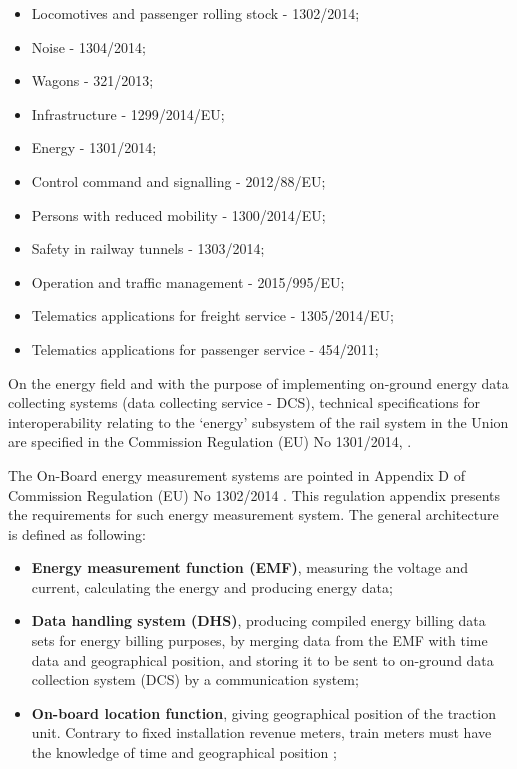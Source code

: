 \begin{itemize}
	\setlength\itemsep{-0.5em}
	\item Locomotives and passenger rolling stock - 1302/2014;
	\item Noise - 1304/2014;
	\item Wagons - 321/2013;
	\item Infrastructure - 1299/2014/EU;
	\item Energy - 1301/2014;
	\item Control command and signalling - 2012/88/EU;
	\item Persons with reduced mobility - 1300/2014/EU;
	\item Safety in railway tunnels - 1303/2014;
	\item Operation and traffic management - 2015/995/EU;
	\item Telematics applications for freight service - 1305/2014/EU;
	\item Telematics applications for passenger service - 454/2011;
		
\end{itemize}


On the energy field and with the purpose of implementing on-ground energy data collecting systems (data collecting service - DCS), technical specifications for interoperability relating to the ‘energy’ subsystem of the rail system in the Union are specified in the Commission Regulation (EU) No 1301/2014, \cite{eur-lex2014}. 



The On-Board energy measurement systems are pointed in Appendix D of Commission Regulation (EU) No 1302/2014 \cite{eur-lex2014b}. This regulation appendix presents the requirements for such energy measurement system. The general architecture is defined as following:

\begin{itemize}
	\setlength\itemsep{-0.5em}
	\item \textbf{Energy measurement function (EMF)}, measuring the voltage and current, calculating the energy and producing energy data;
	\item \textbf{Data handling system (DHS)}, producing compiled energy billing data sets for energy billing purposes, by merging data from the EMF with time data and geographical position, and storing it to be sent to on-ground data collection system (DCS) by a communication system;
	\item \textbf{On-board location function}, giving geographical position of the traction unit. Contrary to fixed installation revenue meters, train meters must have the knowledge of time and geographical position \cite{metas2015};
\end{itemize}

